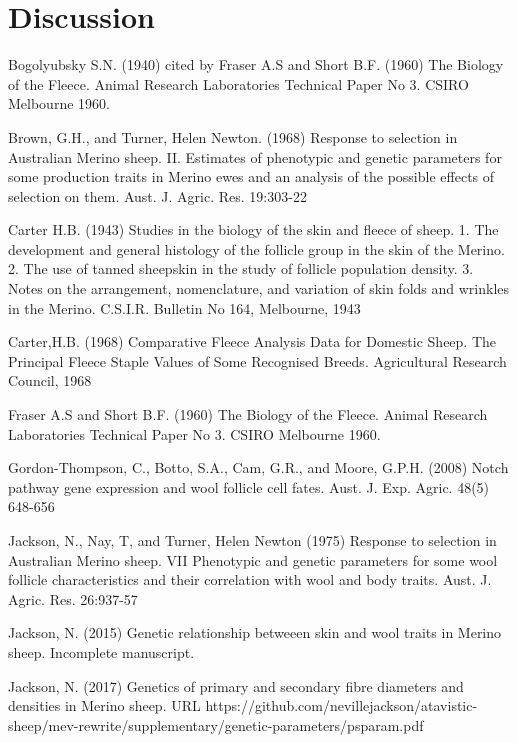 \documentclass[titlepage]{article}  %
\begin{document}
\clearpage
\section{Discussion}





\clearpage
\begin{thebibliography}{99}

 Bogolyubsky S.N. (1940) cited by Fraser A.S and Short B.F. (1960) The Biology of the Fleece. Animal Research Laboratories Technical Paper No 3. CSIRO Melbourne 1960.

Brown, G.H., and Turner, Helen Newton. (1968) Response to selection in Australian Merino sheep. II. Estimates of phenotypic and genetic parameters for some production traits in Merino ewes and an analysis of the possible effects of selection on them. Aust. J. Agric. Res. 19:303-22

Carter H.B. (1943) Studies in the biology of the skin and fleece of sheep. 1. The development and general histology of the follicle group in the skin of the Merino. 2. The use of tanned sheepskin in the study of follicle population density. 3. Notes on the arrangement, nomenclature, and variation of skin folds and wrinkles in the Merino. C.S.I.R. Bulletin No 164, Melbourne, 1943

Carter,H.B. (1968) Comparative Fleece Analysis Data for Domestic Sheep. The Principal Fleece Staple Values of Some Recognised Breeds. Agricultural Research Council, 1968

Fraser A.S and Short B.F. (1960) The Biology of the Fleece. Animal Research Laboratories Technical Paper No 3. CSIRO Melbourne 1960.

Gordon-Thompson, C., Botto, S.A., Cam, G.R., and Moore, G.P.H. (2008) Notch pathway gene expression and wool follicle cell fates. Aust. J. Exp. Agric. 48(5) 648-656

Jackson, N., Nay, T, and Turner, Helen Newton (1975) Response to selection in Australian Merino sheep. VII Phenotypic and genetic parameters for some wool follicle characteristics and their correlation with wool and body traits. Aust. J. Agric. Res. 26:937-57

Jackson, N. (2015) Genetic relationship betweeen skin and wool traits in Merino sheep. Incomplete manuscript.

Jackson, N. (2017) Genetics of primary and secondary fibre diameters and densities in Merino sheep. URL https://github.com/nevillejackson/atavistic-sheep/mev-rewrite/supplementary/genetic-parameters/psparam.pdf


\end{thebibliography}
\end{document}
